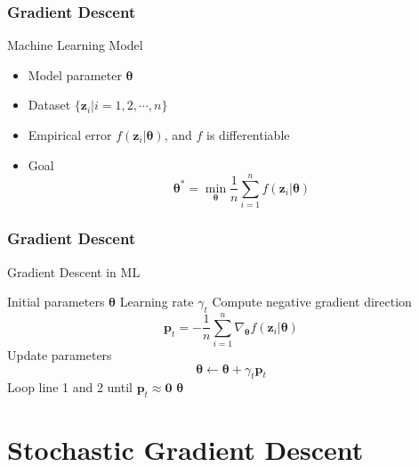 \documentclass[10pt]{beamer}
\theoremstyle{mystyle}
\def\bb#1{\mathbf{#1}}
\newcommand{\bst}{\boldsymbol\theta}
\theoremstyle{mystyle}
\begin{document}
\begin{frame}
	\frametitle{Gradient Descent}
	Machine Learning Model
	\begin{itemize}
		\item Model parameter $\bst$
		\item Dataset $\{\bb{z}_i\vert i=1,2,\cdots, n\}$
		\item Empirical error $f(\bb{z}_i\vert\bst)$, and $f$ is differentiable
		\item Goal $$\bst^*=\min_{\bst}\frac1{n}\sum_{i=1}^n f(\bb{z}_i\vert\bst)$$
	\end{itemize}
\end{frame}

\begin{frame}
	\frametitle{Gradient Descent}
	\begin{algorithm}[H]
		\caption{Gradient Descent in ML}
		\begin{algorithmic}[1]
		\REQUIRE Initial parameters $\bst$
		\REQUIRE Learning rate $\gamma_t$
		\STATE Compute negative gradient direction 
		\begin{equation}\label{eq:1}
			\bb{p}_t=-\frac1{n}\sum_{i=1}^n\nabla_{\bst}f(\bb{z}_i\vert\bst)
		\end{equation}
		\STATE Update parameters $$\bst\leftarrow\bst+\gamma_t\bb{p}_t$$
		\STATE Loop line 1 and 2 until $\bb{p}_t\approx\bb{0}$
		\RETURN $\bst$
		\end{algorithmic}
	\end{algorithm}
\end{frame}

\section{Stochastic Gradient Descent}
\end{document}
